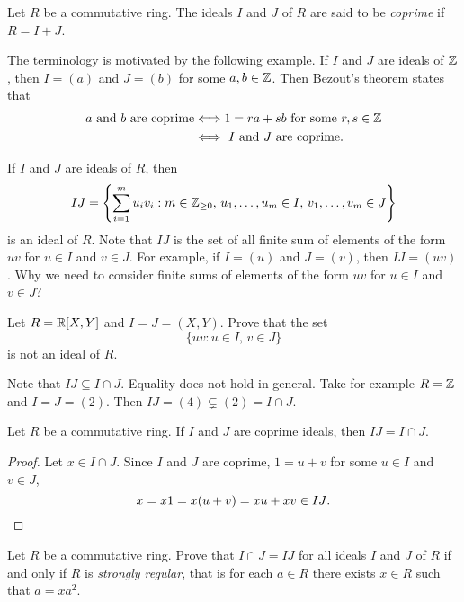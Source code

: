 \begin{definition}
	Let $R$ be a commutative ring. The ideals $I$ and $J$ of $R$ are said to be
	\emph{coprime} if $R=I+J$.  
\end{definition}

The terminology is motivated by the following example. If $I$ and $J$ are
ideals of $\mathbb{Z}$, then $I=(a)$ and $J=(b)$ for some $a,b\in\mathbb{Z}$. Then Bezout's theorem 
states that 
\begin{align*}
\text{$a$ and $b$ are coprime}
&\Longleftrightarrow 1=ra+sb\text{ for some $r,s\in\mathbb{Z}$}\\
&\Longleftrightarrow\text{ $I$ and $J$ are coprime.}
\end{align*}

If $I$ and $J$ are ideals of $R$, then 
\[
	IJ=\left\{\sum_{i=1}^mu_iv_i:m\in\mathbb{Z}_{\geq0},\,u_1,\dots,u_m\in I,\,v_1,\dots,v_m\in J\right\}
\]
is an ideal of $R$. Note that 
$IJ$ is the set of all finite sum of elements of the form $uv$ for $u\in I$ and $v\in J$. 
For example, if $I=(u)$ and $J=(v)$, then $IJ=(uv)$. 
Why we need to consider finite sums of elements of the form $uv$
for $u\in I$ and $v\in J$?

\begin{exercise}
    \label{xca:IJ}
    Let $R=\mathbb{R}[X,Y]$ and $I=J=(X,Y)$. Prove that the
    set \[
    \{uv:u\in I,\,v\in J\}
    \]
    is not an ideal of $R$.
\end{exercise}

Note that $IJ\subseteq I\cap J$. Equality does not hold in general. Take
for example $R=\mathbb{Z}$ and $I=J=(2)$. Then $IJ=(4)\subsetneq (2)=I\cap J$. 

\begin{proposition}
Let $R$ be a commutative ring. If $I$ and $J$ are coprime ideals, then $IJ=I\cap J$. 	
\end{proposition}

\begin{proof}
Let $x\in I\cap J$. Since $I$ and $J$ are coprime, 
$1=u+v$ for some $u\in I$ and $v\in J$, 
\[ 
x=x1=x(u+v)=xu+xv\in IJ\qedhere.
\]
\end{proof}

\begin{bonus}
\label{xca:strongly_regular}
    Let $R$ be a commutative ring. 
    Prove that $I\cap J=IJ$ 
    for all ideals $I$ and $J$ of $R$
    if and only if $R$ is \emph{strongly regular}, 
    that is  
    for each $a\in R$ there 
    exists $x\in R$ such that $a=xa^2$. 
\end{bonus}

